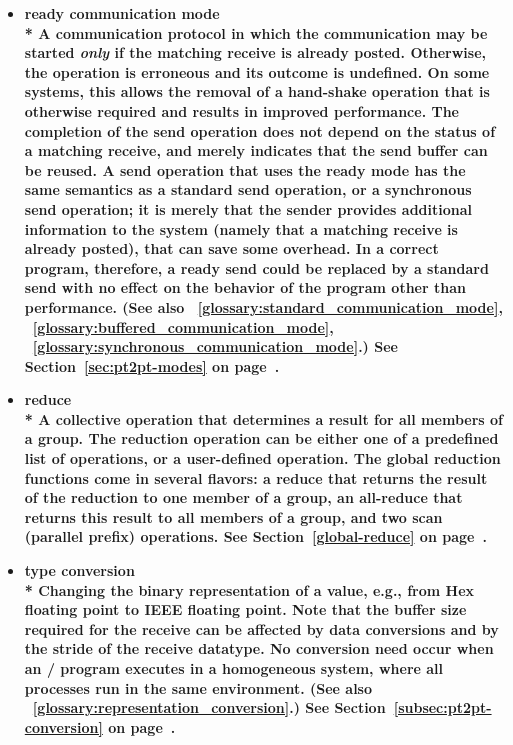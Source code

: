 \begin{itemize}
\label{glossary:ready_communication_mode}
\item \bf{ ready communication mode} \\*
A communication protocol in which the communication
may be started {\em only} if the matching receive is already posted.
Otherwise, the operation is erroneous and its outcome is undefined.
On some systems, this allows the removal of a hand-shake
operation that is otherwise required and results in improved
performance.
The completion of the send operation does not depend on the
status of a matching receive, and merely indicates that the send
buffer can be reused.   A send operation that uses the ready mode has
the same semantics as a standard send operation, or a synchronous send
operation; it is merely that the sender provides additional
information to the system (namely that a matching receive is already
posted), that can save some overhead.  In a correct program, therefore, a
ready send could be replaced by a standard send with no effect on the
behavior of the program other than performance.
(See also ~\ref{glossary:standard_communication_mode}, 
~\ref{glossary:buffered_communication_mode},
~\ref{glossary:synchronous_communication_mode}.)
See Section~\ref{sec:pt2pt-modes} on page~\pageref{sec:pt2pt-modes}.


\label{glossary:reduce}
\item \bf{ reduce} \\*
A collective operation that determines a result for all members of a group.
The reduction operation can be either one of a predefined list of
operations, or a user-defined operation.
The global reduction functions come in several flavors: a reduce that
returns the result of the reduction
to one member of a group,
an all-reduce that
returns this result
to all members of a group,
and 
two 
scan (parallel prefix) 
operations.  
See Section~\ref{global-reduce} on page~\pageref{global-reduce}.

\label{glossary:representation_conversion}
\item \bf{ type conversion} \\*
Changing the binary representation of a value,
e.g., from Hex floating point to IEEE floating point. Note that the buffer size required for the receive can be affected by data conversions and
by the stride of the receive datatype. No conversion need occur when an \MPI/ program executes in
a homogeneous system, where all processes run in the same environment. (See also ~\ref{glossary:representation_conversion}.)
See Section~\ref{subsec:pt2pt-conversion} on page~\pageref{subsec:pt2pt-conversion}.


\end{itemize}
